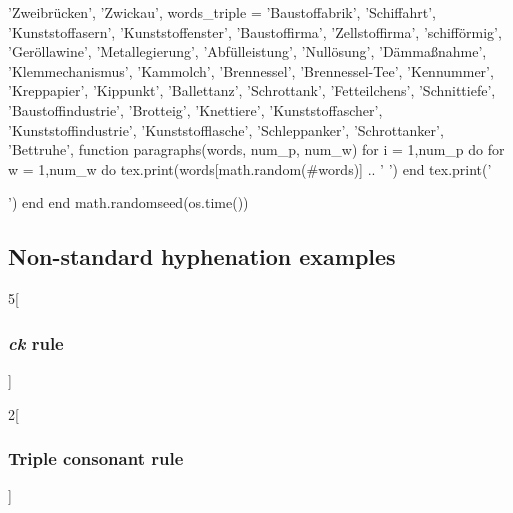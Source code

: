 \documentclass{article}
\begin{document}
{{      'Zweibrücken',
      'Zwickau',
    }
    words_triple = {
      'Baustoffabrik',
      'Schiffahrt',
      'Kunststoffasern',
      'Kunststoffenster',
      'Baustoffirma',
      'Zellstoffirma',
      'schifförmig',
      'Geröllawine',
      'Metallegierung',
      'Abfülleistung',
      'Nullösung',
      'Dämmaßnahme',
      'Klemmechanismus',
      'Kammolch',
      'Brennessel', 'Brennessel-Tee',
      'Kennummer',
      'Kreppapier',
      'Kippunkt',
      'Ballettanz',
      'Schrottank',
      'Fetteilchens',
      'Schnittiefe',
      'Baustoffindustrie',
      'Brotteig',
      'Knettiere',
      'Kunststoffascher',
      'Kunststoffindustrie',
      'Kunststofflasche',
      'Schleppanker',
      'Schrottanker',
      'Bettruhe',
   }
   function paragraphs(words, num_p, num_w)
      for i = 1,num_p do
         for w = 1,num_w do
            tex.print(words[math.random(#words)] .. ' ')
         end
         tex.print('\par')
      end
   end
   math.randomseed(os.time())
}

\subsection{Non-standard hyphenation examples}

\begin{multicols}{5}[\subsubsection{\emph{ck} rule}]
\end{multicols}

\begin{multicols}{2}[\subsubsection{Triple consonant rule}]
\end{multicols}

\begin{otherlanguage}{german}
\end{otherlanguage}
\end{document}
